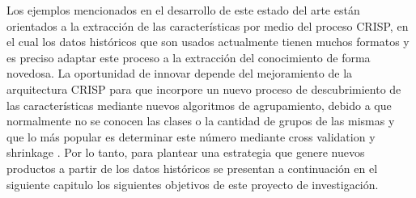 Los ejemplos mencionados en el desarrollo de este estado del arte están orientados a la extracción de las características por medio del proceso CRISP, en el cual los datos históricos que son usados actualmente tienen muchos formatos y es preciso adaptar este proceso a la extracción del conocimiento de forma novedosa. La oportunidad de innovar depende del mejoramiento de la arquitectura CRISP para que incorpore un nuevo proceso de descubrimiento de las características mediante nuevos algoritmos de agrupamiento, debido a que normalmente no se conocen las clases o la cantidad de grupos de las mismas y que lo más popular es determinar este número mediante cross validation \cite{Fan2014} y shrinkage \cite{Simpson}. Por lo tanto, para plantear una estrategia que genere nuevos productos a partir de los datos históricos se presentan a continuación en el siguiente capitulo los siguientes objetivos de este proyecto de investigación.
